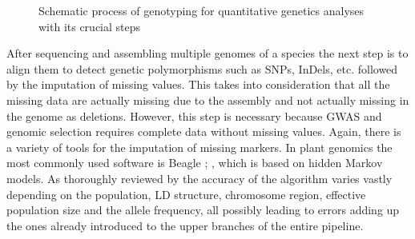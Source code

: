 \begin{figure}[H]
  \begin{center}
    \caption[Schematic process of genotyping for quantitative genetics]{Schematic process of genotyping for quantitative genetics analyses with its crucial steps} \label{fig:quan_flow}
  \end{center}     
\end{figure}

After sequencing and assembling multiple genomes of a species the next step is to align
them to detect genetic polymorphisms such as SNPs, InDels, etc. followed by the imputation
of missing values. This takes into consideration that all the missing data are actually
missing due to the assembly and not actually missing in the genome as deletions. However,
this step is necessary because GWAS and genomic selection requires complete data without
missing values.  Again, there is a variety of tools for the imputation of missing
markers. In plant genomics the most commonly used software is Beagle
\cite{browning2007rapid}; \cite{browning2018one}, which is based on hidden Markov models.
As thoroughly reviewed by \cite{pook2019improving} the accuracy of the algorithm varies
vastly depending on the population, LD structure, chromosome region, effective population
size and the allele frequency, all possibly leading to errors adding up the ones already
introduced to the upper branches of the entire pipeline.


